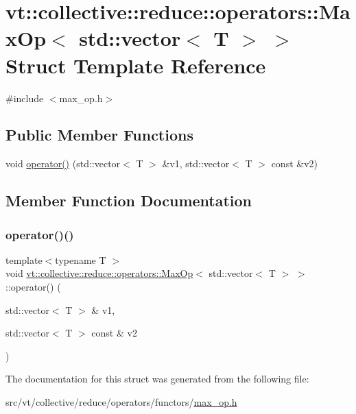 \hypertarget{structvt_1_1collective_1_1reduce_1_1operators_1_1_max_op_3_01std_1_1vector_3_01_t_01_4_01_4}{}\section{vt\+:\+:collective\+:\+:reduce\+:\+:operators\+:\+:Max\+Op$<$ std\+:\+:vector$<$ T $>$ $>$ Struct Template Reference}
\label{structvt_1_1collective_1_1reduce_1_1operators_1_1_max_op_3_01std_1_1vector_3_01_t_01_4_01_4}


{\ttfamily \#include $<$max\+\_\+op.\+h$>$}

\subsection*{Public Member Functions}
\begin{DoxyCompactItemize}
\item 
void \hyperlink{structvt_1_1collective_1_1reduce_1_1operators_1_1_max_op_3_01std_1_1vector_3_01_t_01_4_01_4_a263c22fc3de4fc0f7eb92b8eb0ef9f7b}{operator()} (std\+::vector$<$ T $>$ \&v1, std\+::vector$<$ T $>$ const \&v2)
\end{DoxyCompactItemize}


\subsection{Member Function Documentation}
\mbox{\label{structvt_1_1collective_1_1reduce_1_1operators_1_1_max_op_3_01std_1_1vector_3_01_t_01_4_01_4_a263c22fc3de4fc0f7eb92b8eb0ef9f7b}} 
\subsubsection{\texorpdfstring{operator()()}{operator()()}}
{\footnotesize\ttfamily template$<$typename T $>$ \\
void \hyperlink{structvt_1_1collective_1_1reduce_1_1operators_1_1_max_op}{vt\+::collective\+::reduce\+::operators\+::\+Max\+Op}$<$ std\+::vector$<$ T $>$ $>$\+::operator() (\begin{DoxyParamCaption}\item[{std\+::vector$<$ T $>$ \&}]{v1,  }\item[{std\+::vector$<$ T $>$ const \&}]{v2 }\end{DoxyParamCaption})\hspace{0.3cm}{\ttfamily [inline]}}



The documentation for this struct was generated from the following file\+:\begin{DoxyCompactItemize}
\item 
src/vt/collective/reduce/operators/functors/\hyperlink{max__op_8h}{max\+\_\+op.\+h}\end{DoxyCompactItemize}

